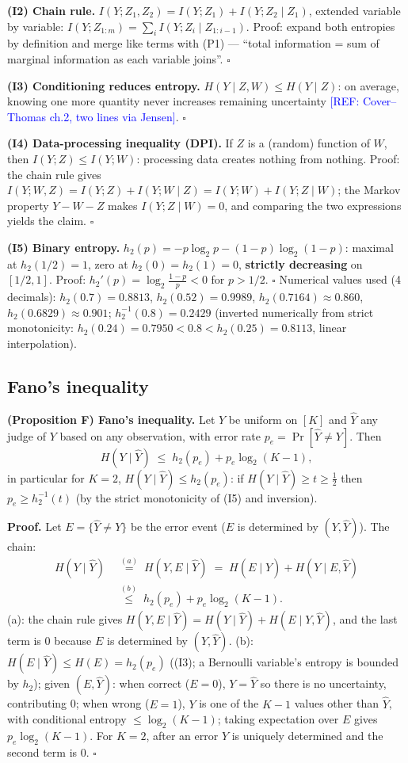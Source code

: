 \documentclass{article}
\newcommand{\refadd}[1]{\textcolor{blue}{[REF: #1]}}
\providecommand{\qed}{\hfill$\square$}
\begin{document}
\textbf{(I2) Chain rule.} $I(Y;Z_1,Z_2)=I(Y;Z_1)+I(Y;Z_2\mid Z_1)$, extended variable by variable: $I(Y;Z_{1:m})=\sum_i I(Y;Z_i\mid Z_{1:i-1})$. Proof: expand both entropies by definition and merge like terms with (P1) --- ``total information = sum of marginal information as each variable joins''. \qed{}

\textbf{(I3) Conditioning reduces entropy.} $H(Y\mid Z,W)\le H(Y\mid Z)$: on average, knowing one more quantity never increases remaining uncertainty \refadd{Cover--Thomas ch.2, two lines via Jensen}. \qed{}

\textbf{(I4) Data-processing inequality (DPI).} If $Z$ is a (random) function of $W$, then $I(Y;Z)\le I(Y;W)$: processing data creates nothing from nothing. Proof: the chain rule gives $I(Y;W,Z)=I(Y;Z)+I(Y;W\mid Z)=I(Y;W)+I(Y;Z\mid W)$; the Markov property $Y-W-Z$ makes $I(Y;Z\mid W)=0$, and comparing the two expressions yields the claim. \qed{}

\textbf{(I5) Binary entropy.} $h_2(p)=-p\log_2p-(1-p)\log_2(1-p)$: maximal at $h_2(1/2)=1$, zero at $h_2(0)=h_2(1)=0$, \textbf{strictly decreasing} on $[1/2,1]$. Proof: $h_2'(p)=\log_2\frac{1-p}{p}<0$ for $p>1/2$. \qed{} Numerical values used (4 decimals): $h_2(0.7)=0.8813$, $h_2(0.52)=0.9989$, $h_2(0.7164)\approx0.860$, $h_2(0.6829)\approx0.901$; $h_2^{-1}(0.8)=0.2429$ (inverted numerically from strict monotonicity: $h_2(0.24)=0.7950<0.8<h_2(0.25)=0.8113$, linear interpolation).

\subsection{Fano's inequality}

\textbf{(Proposition F) Fano's inequality.} Let $Y$ be uniform on $[K]$ and $\hat Y$ any judge of $Y$ based on any observation, with error rate $p_e=\Pr[\hat Y\ne Y]$. Then
\[
H(Y\mid \hat Y)\;\le\;h_2(p_e)+p_e\log_2(K-1),
\]
in particular for $K=2$, $H(Y\mid\hat Y)\le h_2(p_e)$: if $H(Y\mid\hat Y)\ge t\ge\tfrac12$ then $p_e\ge h_2^{-1}(t)$ (by the strict monotonicity of (I5) and inversion).

\textbf{Proof.} Let $E=\{\hat Y\ne Y\}$ be the error event ($E$ is determined by $(Y,\hat Y)$). The chain:
\[
\begin{aligned}
H(Y\mid\hat Y)\;&\overset{(a)}{=}\;H(Y,E\mid\hat Y)\;=\;H(E\mid\hat Y)+H(Y\mid E,\hat Y)\\
&\overset{(b)}{\le}\;h_2(p_e)+p_e\log_2(K-1).
\end{aligned}
\]
(a): the chain rule gives $H(Y,E\mid\hat Y)=H(Y\mid\hat Y)+H(E\mid Y,\hat Y)$, and the last term is 0 because $E$ is determined by $(Y,\hat Y)$. (b): $H(E\mid\hat Y)\le H(E)=h_2(p_e)$ ((I3); a Bernoulli variable's entropy is bounded by $h_2$); given $(E,\hat Y)$: when correct ($E{=}0$), $Y=\hat Y$ so there is no uncertainty, contributing 0; when wrong ($E{=}1$), $Y$ is one of the $K-1$ values other than $\hat Y$, with conditional entropy $\le\log_2(K-1)$; taking expectation over $E$ gives $p_e\log_2(K-1)$. For $K=2$, after an error $Y$ is uniquely determined and the second term is 0. \qed{}
\end{document}

